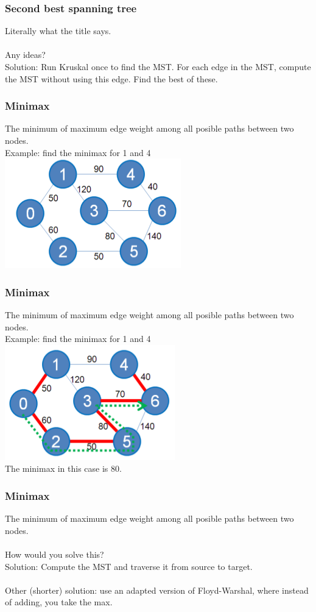 \documentclass[12pt]{beamer}
\begin{document}
\begin{frame}
	\frametitle{Second best spanning tree}
	Literally what the title says.\\~\\
	Any ideas?\\
	\pause
	Solution: Run Kruskal once to find the MST. For each edge in the MST, compute the MST without using this edge. Find the best of these.
	
\end{frame}

\begin{frame}
	\frametitle{Minimax}
	The minimum of maximum edge weight among all posible paths between two nodes.\\
	Example: find the minimax for 1 and 4\\
	\includegraphics[width=0.6\linewidth]{img/minimax-graph}
\end{frame}

\begin{frame}
	\frametitle{Minimax}
	The minimum of maximum edge weight among all posible paths between two nodes.\\
	Example: find the minimax for 1 and 4\\
	\includegraphics[width=0.6\linewidth]{img/minimax-graph-correct}\\
	The minimax in this case is 80.
\end{frame}

\begin{frame}
	\frametitle{Minimax}
	The minimum of maximum edge weight among all posible paths between two nodes.\\~\\
	How would you solve this?\\
	Solution: Compute the MST and traverse it from source to target.\\~\\
	\pause
	Other (shorter) solution: use an adapted version of Floyd-Warshal, where instead of adding, you take the max.
\end{frame}
\end{document}
